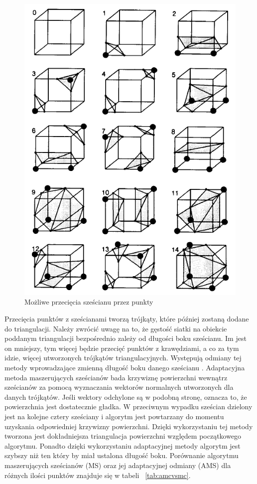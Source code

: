 \begin{figure}[H]
  \centering
  \includegraphics[scale=0.5]{przeciecia.PNG}
  \caption{Możliwe przecięcia sześcianu przez punkty \cite{lorensen1987marching}}   
  \label{fig:marchingCubesCut}
\end{figure}
Przecięcia punktów z sześcianami tworzą trójkąty, które później zostaną dodane do triangulacji. Należy zwrócić uwagę na to, że gęstość siatki na obiekcie poddanym triangulacji bezpośrednio zależy od długości boku sześcianu. Im jest on mniejszy, tym więcej będzie przecięć punktów z krawędziami, a co za tym idzie, więcej utworzonych trójkątów triangulacyjnych. Występują odmiany tej metody wprowadzające zmienną długość boku danego sześcianu \cite{shu1995adaptive}. Adaptacyjna metoda maszerujących sześcianów bada krzywiznę powierzchni wewnątrz sześcianów za pomocą wyznaczania wektorów normalnych utworzonych dla danych trójkątów. Jeśli wektory odchylone są w podobną stronę, oznacza to, że powierzchnia jest dostatecznie gładka. W przeciwnym wypadku sześcian dzielony jest na kolejne cztery sześciany i algorytm jest powtarzany do momentu uzyskania odpowiedniej krzywizny powierzchni. Dzięki wykorzystaniu tej metody tworzona jest dokładniejsza triangulacja powierzchni względem początkowego algorytmu. Ponadto dzięki wykorzystaniu adaptacyjnej metody algorytm jest szybszy niż ten który by miał ustalona długość boku. Porównanie algorytmu maszerujących sześcianów (MS) oraz jej adaptacyjnej odmiany (AMS) dla różnych ilości punktów znajduje się w tabeli ~\ref{tab:amcvsmc}.

